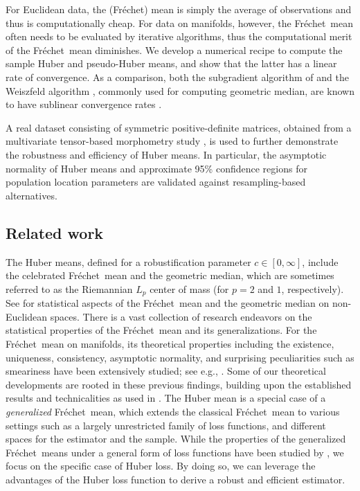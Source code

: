\documentclass[preprint]{imsart}
\def\Frechet{Fr\'{e}chet}
\theoremstyle{plain}
\theoremstyle{remark}
\begin{document}
For Euclidean data, the (\Frechet) mean is simply the average of observations and thus is computationally cheap. For data on manifolds, however, the \Frechet\ mean often needs to be evaluated by iterative algorithms, thus the computational merit of the \Frechet\ mean diminishes. We develop a numerical recipe to compute the sample Huber and pseudo-Huber means, and show that the latter has a linear rate of convergence. As a comparison, both the subgradient algorithm of \cite{yang2010riemannian} and the Weiszfeld algorithm \citep{fletcher2009geometric}, commonly used for computing geometric median, are known to have sublinear convergence rates \citep{yang2010riemannian}.
 


A real dataset consisting of symmetric positive-definite matrices, obtained from a multivariate tensor-based morphometry study \citep{paquette2017ventricular}, is used to further demonstrate the robustness and efficiency of Huber means. In particular, the asymptotic normality of Huber means and approximate 95\% confidence regions for population location parameters are validated against resampling-based alternatives.




\subsection{Related work} 



The Huber means, defined for a robustification parameter $c \in [0,\infty]$, include the celebrated \Frechet\ mean and the geometric median, which are sometimes referred to as the Riemannian $L_p$ center of mass \citep{afsari2011riemannian} (for $p = 2$ and $1$, respectively). See \cite{bhattacharya2005large, huckemann2011intrinsic, afsari2011riemannian, eltzner2019smeary, huckemann2021data,fletcher2009geometric, arnaudon2012medians} for statistical aspects of the \Frechet\ mean and the geometric median on non-Euclidean spaces. There is a vast collection of research endeavors on the statistical properties of the \Frechet\ mean and its generalizations. For the \Frechet\ mean on manifolds, its theoretical properties including the existence, uniqueness, consistency, asymptotic normality, and surprising peculiarities such as smeariness have been extensively studied; see e.g., \cite{huckemann2021data, eltzner2019smeary}. Some of our theoretical developments are rooted in these previous findings, building upon the established results and technicalities as used in \cite{huckemann2011inference, afsari2011riemannian, jung2025averaging}. 
The Huber mean is a special case of a \textit{generalized} \Frechet\ mean, which extends the classical \Frechet\ mean to various settings such as a largely unrestricted family of loss functions, and different spaces for the estimator and the sample. While the properties of the generalized \Frechet\ means under a general form of loss functions have been studied by \cite{huckemann2011inference, schotz2019convergence, schotz2022strong, park2023strong,evans2024limit}, we focus on the specific case of Huber loss. By doing so, we can leverage the advantages of the Huber loss function to derive a robust and efficient estimator.
\end{document}

